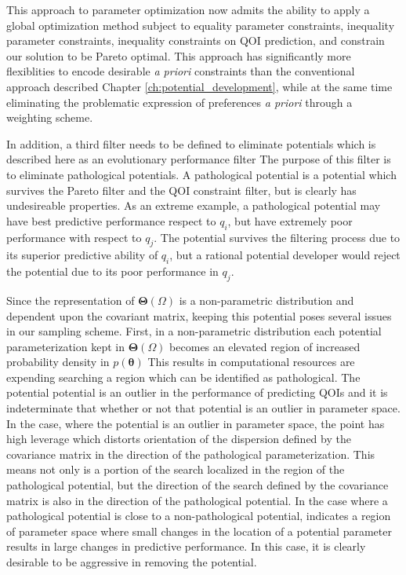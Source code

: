 This approach to parameter optimization now admits the ability to apply a global optimization method subject to equality parameter constraints, inequality parameter constraints, inequality constraints on QOI prediction, and constrain our solution to be Pareto optimal.  This approach has significantly more flexiblities to encode desirable \emph{a priori} constraints than the conventional approach described Chapter \ref{ch:potential_development}, while at the same time eliminating the problematic expression of preferences \emph{a priori} through a weighting scheme.

In addition, a third filter needs to be defined to eliminate potentials which is described here as an evolutionary performance filter  The purpose of this filter is to eliminate pathological potentials.  A pathological potential is a potential which survives the Pareto filter and the QOI constraint filter, but is clearly has undesireable properties.  As an extreme example, a pathological potential may have best predictive performance respect to $q_i$, but have extremely poor performance with respect to $q_j$.  The potential survives the filtering process due to its superior predictive ability of $q_i$, but a rational potential developer would reject the potential due to its poor performance in $q_j$.

  Since the representation of $\bm{\Theta}(\Omega)$ is a non-parametric distribution and dependent upon the covariant matrix, keeping this potential poses several issues in our sampling scheme.  First, in a non-parametric distribution each potential parameterization kept in $\bm{\Theta}(\Omega)$ becomes an elevated region of increased probability density in $p(\bm{\theta})$  This results in computational resources are expending searching a region which can be identified as pathological.  The potential potential is an outlier in the performance of predicting QOIs and it is indeterminate that whether or not that potential is an outlier in parameter space.  In the case, where the potential is an outlier in parameter space, the point has high leverage which distorts orientation of the dispersion defined by the covariance matrix in the direction of the pathological parameterization.  This means not only is a portion of the search localized in the region of the pathological potential, but the direction of the search defined by the covariance matrix is also in the direction of the pathological potential.  In the case where a pathological potential is close to a non-pathological potential, indicates a region of parameter space where small changes in the location of a potential parameter results in large changes in predictive performance.  In this case, it is clearly desirable to be aggressive in removing the potential.

